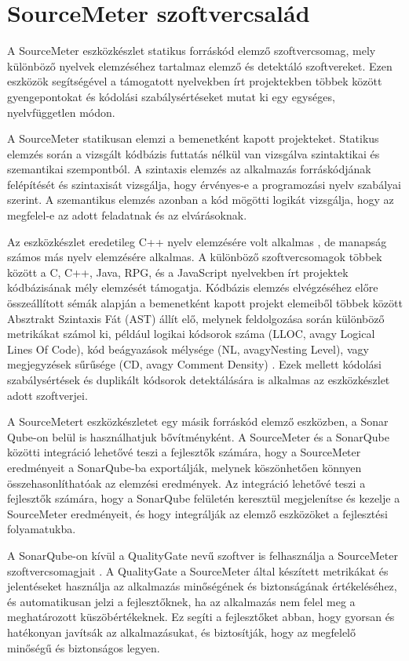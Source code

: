 \chapter{SourceMeter szoftvercsalád}
\label{chap:fejezet2}

A SourceMeter eszközkészlet statikus forráskód elemző szoftvercsomag, mely különböző nyelvek elemzéséhez tartalmaz elemző és detektáló szoftvereket. Ezen eszközök segítségével a támogatott nyelvekben írt projektekben többek között gyengepontokat és kódolási szabálysértéseket mutat ki egy egységes, nyelvfüggetlen módon.

A SourceMeter statikusan elemzi a bemenetként kapott projekteket. 
Statikus elemzés során a vizsgált kódbázis futtatás nélkül van vizsgálva szintaktikai és szemantikai szempontból. A szintaxis elemzés az alkalmazás forráskódjának felépítését és szintaxisát vizsgálja, hogy érvényes-e a programozási nyelv szabályai szerint. A szemantikus elemzés azonban a kód mögötti logikát vizsgálja, hogy az megfelel-e az adott feladatnak és az elvárásoknak. 

Az eszközkészlet eredetileg C++ nyelv elemzésére volt alkalmas \cite{1167764}, de manapság számos más nyelv elemzésére alkalmas. A különböző szoftvercsomagok többek között a C, C++, Java, RPG, és a JavaScript nyelvekben írt projektek kódbázisának mély elemzését támogatja.
Kódbázis elemzés elvégzéséhez előre összeállított sémák alapján a bemenetként kapott projekt elemeiből többek között Absztrakt Szintaxis Fát (AST) állít elő, melynek feldolgozása során különböző metrikákat számol ki, például logikai kódsorok száma (LLOC, avagy Logical Lines Of Code), kód beágyazások mélysége (NL, avagyNesting Level), vagy megjegyzések sűrűsége (CD, avagy Comment Density) \cite{siket2014differences}. Ezek mellett kódolási szabálysértések és duplikált kódsorok detektálására is alkalmas az eszközkészlet adott szoftverjei.

A SourceMetert eszközkészletet egy másik forráskód elemző eszközben, a Sonar Qube-on belül is használhatjuk bővítményként. A SourceMeter és a SonarQube közötti integráció lehetővé teszi a fejlesztők számára, hogy a SourceMeter eredményeit a SonarQube-ba exportálják, melynek köszönhetően könnyen összehasonlíthatóak az elemzési eredmények. Az integráció lehetővé teszi a fejlesztők számára, hogy a SonarQube felületén keresztül megjelenítse és kezelje a SourceMeter eredményeit, és hogy integrálják az elemző eszközöket a fejlesztési folyamatukba.

A SonarQube-on kívül a QualityGate nevű szoftver is felhasználja a SourceMeter szoftvercsomagjait \cite{6747214}. A QualityGate a SourceMeter által készített metrikákat és jelentéseket használja az alkalmazás minőségének és biztonságának értékeléséhez, és automatikusan jelzi a fejlesztőknek, ha az alkalmazás nem felel meg a meghatározott küszöbértékeknek. Ez segíti a fejlesztőket abban, hogy gyorsan és hatékonyan javítsák az alkalmazásukat, és biztosítják, hogy az megfelelő minőségű és biztonságos legyen.

